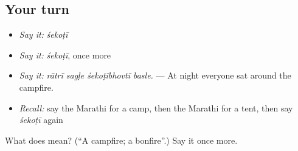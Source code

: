 \subsection*{Your turn}
\begin{itemize}
\raggedright
  \item \emph{Say it:} \emph{śekoṭī}
  \item \emph{Say it:} \emph{śekoṭī}, once more
  \item \emph{Say it:} \emph{rātrī sagḷe śekoṭībhovtī basle.} — At night everyone sat around the campfire.
  \item \emph{Recall:} say the Marathi for a camp, then the Marathi for a tent, then say \emph{śekoṭī} again
\end{itemize}

\begin{tcolorbox}[breakable,colback=teal!4,colframe=teal!35!black,title={Before you move on}]
What does  mean? (\textquotedblleft{}A campfire; a bonfire\textquotedblright{}.) Say it once more.
\end{tcolorbox}

